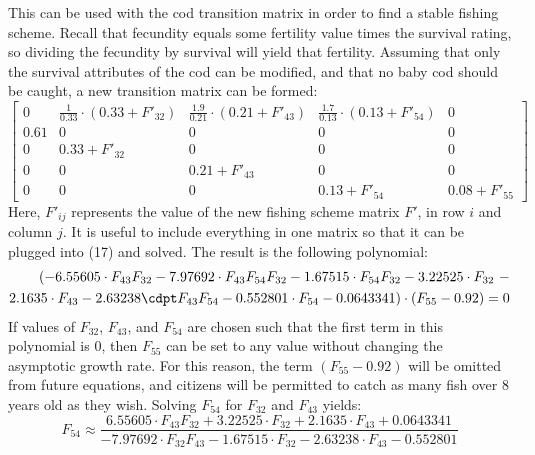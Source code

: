 \documentclass{article}
\begin{document}
    This can be used with the cod transition matrix in order to find a stable fishing scheme.
    Recall that fecundity equals some fertility value times the survival rating, so dividing the fecundity by survival will yield that fertility.
    Assuming that only the survival attributes of the cod can be modified, and that no baby cod should be caught, a new transition matrix can be formed:
    \begin{equation}
        \begin{bmatrix}
            0    & \frac{1}{0.33} \cdot (0.33 + F'_{32}) & \frac{1.9}{0.21} \cdot (0.21 + F'_{43}) & \frac{1.7}{0.13} \cdot (0.13 + F'_{54}) & 0   \\
            0.61 & 0   & 0   & 0   & 0   \\
            0    & 0.33 + F'_{32} & 0   & 0   & 0   \\
            0    & 0   & 0.21 + F'_{43} & 0   & 0   \\
            0    & 0   & 0   & 0.13 + F'_{54} & 0.08 + F'_{55}
        \end{bmatrix}\label{eq:equation18}
    \end{equation}
    Here, $F'_{ij}$ represents the value of the new fishing scheme matrix $F'$, in row $i$ and column $j$.
    It is useful to include everything in one matrix so that it can be plugged into (17) and solved.
    The result is the following polynomial:
    \begin{equation}
        \begin{split}
        (-6.55605 \cdot F_{43} F_{32} - 7.97692 \cdot F_{43} F_{54} F_{32} - 1.67515 \cdot F_{54} F_{32} - 3.22525 \cdot F_{32}~- \\
        2.1635 \cdot F_{43} - 2.63238 \cdpt F_{43} F_{54} - 0.552801 \cdot F_{54} - 0.0643341) \cdot (F_{55} - 0.92) = 0
        \end{split}\label{eq:equation19}
    \end{equation}
    \hspace{\parindent}If values of $F_{32}$, $F_{43}$, and $F_{54}$ are chosen such that the first term in this polynomial is 0, then $F_{55}$ can be set to any value without changing the asymptotic growth rate.
    For this reason, the term $(F_{55} - 0.92)$ will be omitted from future equations, and citizens will be permitted to catch as many fish over 8 years old as they wish.
    Solving $F_{54}$ for $F_{32}$ and $F_{43}$ yields:
    \begin{equation}
        F_{54} \approx \frac
        {6.55605 \cdot F_{43} F_{32} + 3.22525 \cdot F_{32} + 2.1635 \cdot F_{43} + 0.0643341}
        {-7.97692 \cdot F_{32} F_{43} - 1.67515 \cdot F_{32} - 2.63238 \cdot F_{43} - 0.552801}\label{eq:equation20}
    \end{equation}
\end{document}
